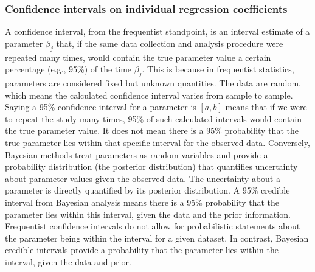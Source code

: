 \documentclass[letterpaper,10pt,english]{jupyterBook}
\begin{document}
\subsubsection{Confidence intervals on individual regression coefficients}
\label{\detokenize{notebooks/review_linear_models:confidence-intervals-on-individual-regression-coefficients}}
\sphinxAtStartPar
A confidence interval, from the frequentist standpoint, is an interval estimate of a parameter \(\beta_j\) that, if the same data collection and analysis procedure were repeated many times, would contain the true parameter value a certain percentage (e.g., 95\%) of the time \(\beta_j\). This is because in frequentist statistics, parameters are considered fixed but unknown quantities. The data are random, which means the calculated confidence interval varies from sample to sample. Saying a 95\% confidence interval for a parameter is \([a, b]\) means that if we were to repeat the study many times, 95\% of such calculated intervals would contain the true parameter value. It does not mean there is a 95\% probability that the true parameter lies within that specific interval for the observed data. Conversely, Bayesian methods treat parameters as random variables and provide a probability distribution (the posterior distribution) that quantifies uncertainty about parameter values given the observed data. The uncertainty about a parameter is directly quantified by its posterior distribution. A 95\% credible interval from Bayesian analysis means there is a 95\% probability that the parameter lies within this interval, given the data and the prior information. Frequentist confidence intervals do not allow for probabilistic statements about the parameter being within the interval for a given dataset. In contrast, Bayesian credible intervals provide a probability that the parameter lies within the interval, given the data and prior.
\end{document}
